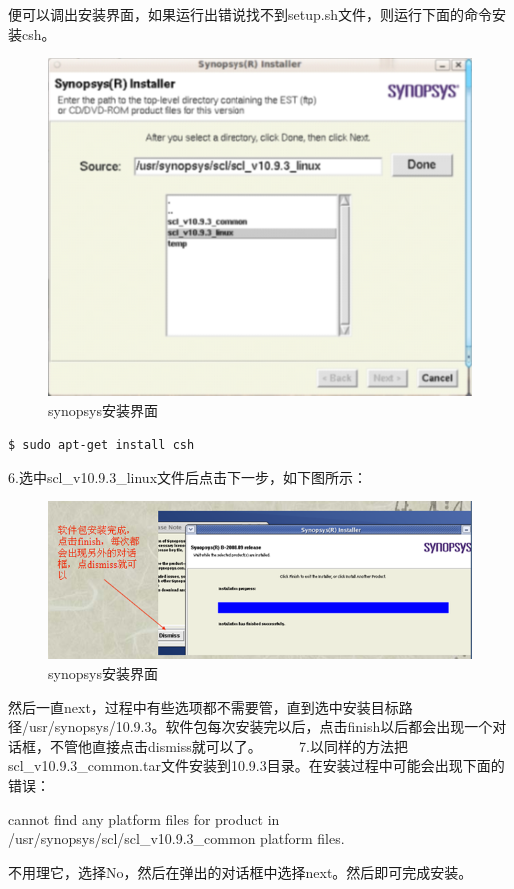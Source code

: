 便可以调出安装界面，如果运行出错说找不到setup.sh文件，则运行下面的命令安装csh。
\begin{figure}
\centering\includegraphics[scale=0.5]{figures/synopsys1.png}
\caption{synopsys安装界面}\label{synopsys1}
\end{figure}
\verb"$ sudo apt-get install csh"

6.选中scl\_v10.9.3\_linux文件后点击下一步，如下图所示：
\begin{figure}
\centering\includegraphics[scale=0.5]{figures/synopsys2.png}
\caption{synopsys安装界面}\label{synopsys2}
\end{figure}
然后一直next，过程中有些选项都不需要管，直到选中安装目标路径/usr/synopsys/10.9.3。软件包每次安装完以后，点击finish以后都会出现一个对话框，不管他直接点击dismiss就可以了。
　　
7.以同样的方法把scl\_v10.9.3\_common.tar文件安装到10.9.3目录。在安装过程中可能会出现下面的错误：

cannot find any platform files for product in /usr/synopsys/scl/scl\_v10.9.3\_common platform files.

不用理它，选择No，然后在弹出的对话框中选择next。然后即可完成安装。

